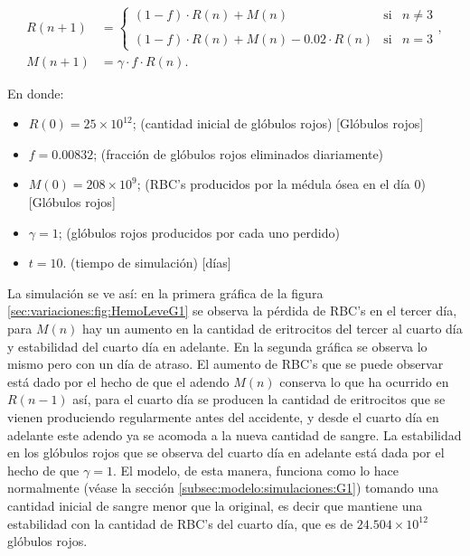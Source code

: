 \begin{align}\label{eq:HemoLeveMal}
    R(n+1) &= \left\{ \begin{array}{lcc} (1-f)\cdot R(n)+M(n) & \textrm{si} & n \neq 3 \\ \\ (1-f)\cdot R(n)+M(n)-0.02\cdot R(n) & \textrm{si} & n = 3\end{array} \right., \\
    M(n+1) &=\gamma \cdot f \cdot R(n). \nonumber
\end{align}

En donde:
\begin{itemize}
    \item $R(0) = 25\times 10^{12}$; (cantidad inicial de glóbulos rojos) [Glóbulos rojos]
    \item $f=0.00832$; (fracción de glóbulos rojos eliminados diariamente)
    \item $M(0) = 208 \times 10^{9}$; (RBC's producidos por la médula ósea en el día 0) [Glóbulos rojos]
    \item $\gamma=1$; (glóbulos rojos producidos por cada uno perdido)
    \item $t = 10$. (tiempo de simulación) [días]
\end{itemize}

La simulación se ve así: en la primera gráfica de la figura \ref{sec:variaciones:fig:HemoLeveG1} se observa la pérdida de RBC's en el tercer día, para $M(n)$ hay un aumento en la cantidad de eritrocitos del tercer al cuarto día y estabilidad del cuarto día en adelante. En la segunda gráfica se observa lo mismo pero con un día de atraso. El aumento de RBC's que se puede observar está dado por el hecho de que el adendo $M(n)$ conserva lo que ha ocurrido en $R(n-1)$ así, para el cuarto día se producen la cantidad de eritrocitos que se vienen produciendo regularmente antes del accidente, y desde el cuarto día en adelante este adendo ya se acomoda a la nueva cantidad de sangre. La estabilidad en los glóbulos rojos que se observa del cuarto día en adelante está dada por el hecho de que $\gamma = 1$. El modelo, de esta manera, funciona como lo hace normalmente (véase la sección \ref{subsec:modelo:simulaciones:G1}) tomando una cantidad inicial de sangre menor que la original, es decir que mantiene una estabilidad con la cantidad de RBC's del cuarto día, que es de $24.504\times 10^{12}$ glóbulos rojos. 

